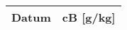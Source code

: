 \documentclass[a4paper,twoside,11pt]{article}
\begin{document}
\begin{tabular}{|l|l|}
\hline
Datum & cB [g/kg] \\
\hline

\end{tabular}
\end{document}
